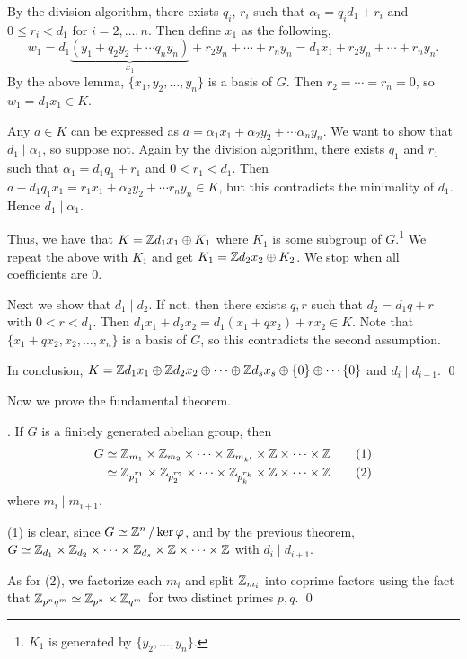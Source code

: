  By the division algorithm, there exists \(q_i\), \(r_i\) such that \(\alpha_i = q_i d_1 + r_i\) and \(0 \leq r_i < d_1\) for \(i = 2, \dots, n\). Then define \(x_1\) as the following,
\[
    w_1 = d_1\underbrace{(y_1 + q_2y_2 + \cdots q_ny_n)}_{x_1} + r_2y_n + \cdots + r_ny_n = d_1x_1 + r_2y_n + \cdots + r_ny_n.
\]
By the above lemma, \(\{x_1, y_2, \dots, y_n\}\) is a basis of \(G\). Then \(r_2 = \cdots = r_n = 0\), so \(w_1 = d_1x_1 \in K\).

 Any \(a \in K\) can be expressed as \(a = \alpha_1 x_1 + \alpha_2 y_2 + \cdots \alpha_n y_n\). We want to show that \(d_1 \mid \alpha_1\), so suppose not. Again by the division algorithm, there exists \(q_1\) and \(r_1\) such that \(\alpha_1 = d_1 q_1 + r_1\) and \(0 < r_1 < d_1\). Then \(a - d_1q_1x_1 = r_1x_1 + \alpha_2y_2 + \cdots r_ny_n \in K\), but this contradicts the minimality of \(d_1\). Hence \(d_1 \mid \alpha_1\).

Thus, we have that \(K = \mathbb{Z} d_1 x_1 \oplus K_1\) where \(K_1\) is some subgroup of \(G\).\footnote{\(K_1\) is generated by \(\{y_2, \dots, y_n\}\).} We repeat the above with \(K_1\) and get \(K_1 = \mathbb{Z} d_2 x_2 \oplus K_2\). We stop when all coefficients are \(0\).

 Next we show that \(d_1 \mid d_2\). If not, then there exists \(q, r\) such that \(d_2 = d_1q+r\) with \(0 < r < d_1\). Then \(d_1x_1 + d_2x_2 = d_1(x_1 + qx_2) + rx_2 \in K\). Note that \(\{x_1 + qx_2, x_2, \dots, x_n\}\) is a basis of \(G\), so this contradicts the second assumption.

In conclusion, \(K = \mathbb{Z} d_1 x_1 \oplus \mathbb{Z} d_2 x_2 \oplus \cdots \oplus \mathbb{Z} d_s x_s \oplus \{0\} \oplus \cdots \{0\}\) and \(d_i \mid d_{i+1}\). \qed

\medskip

Now we prove the fundamental theorem.

\thm. If \(G\) is a finitely generated abelian group, then
\[
    \begin{aligned}
        G & \simeq \mathbb{Z}_{m_1} \times \mathbb{Z}_{m_2} \times \cdots \times \mathbb{Z}_{m_{k'}} \times \mathbb{Z} \times \cdots \times \mathbb{Z} \qquad (1)                \\
          & \simeq \mathbb{Z}_{p_1^{r_1}} \times \mathbb{Z}_{p_2^{r_2}} \times \cdots \times \mathbb{Z}_{p_k^{r_k}} \times \mathbb{Z} \times \cdots \times \mathbb{Z} \qquad (2)
    \end{aligned}
\]
where \(m_i \mid m_{i+1}\).

\pf (1) is clear, since \(G \simeq \mathbb{Z}^n \operatorname{/} \ker \varphi\), and by the previous theorem, \(G \simeq \mathbb{Z}_{d_1} \times \mathbb{Z}_{d_2} \times \cdots \times \mathbb{Z}_{d_s} \times \mathbb{Z} \times \cdots \times \mathbb{Z}\) with \(d_i \mid d_{i+1}\).

As for (2), we factorize each \(m_i\) and split \(\mathbb{Z}_{m_i}\) into coprime factors using the fact that \(\mathbb{Z}_{p^nq^m} \simeq \mathbb{Z}_{p^n} \times \mathbb{Z}_{q^m}\) for two distinct primes \(p, q\). \qed

\pagebreak
